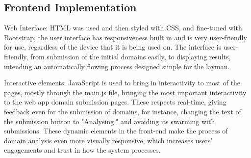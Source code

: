 \subsection{Frontend Implementation}

Web Interface: HTML was used and then styled with CSS, and fine-tuned with Bootstrap, the user interface has responsiveness built in and is very user-friendly for use, regardless of the device that it is being used on. The interface is user-friendly, from submission of the initial domains easily, to displaying results, intending an automatically flowing process designed simple for the layman.


Interactive elements: JavaScript is used to bring in interactivity to most of the pages, mostly through the main.js file, bringing the most important interactivity to the web app domain submission pages. These respects real-time, giving feedback even for the submission of domains, for instance, changing the text of the submission button to "Analysing." and avoiding its swarming with submissions. These dynamic elements in the front-end make the process of domain analysis even more visually responsive, which increases users' engagements and trust in how the system processes.

